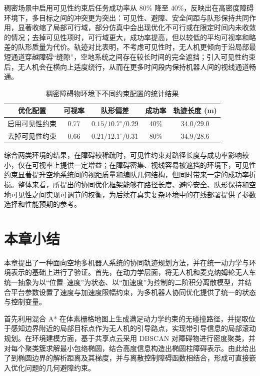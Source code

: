 稠密场景中启用可见性约束后任务成功率从 \(80\%\) 降至 \(40\%\)，反映出在高密度障碍环境下，多目标之间的冲突更为突出：可见性、避障、安全间距与队形保持共同作用，显著收缩了局部可行域，部分仿真中会出现优化不可行或在限定时间内未收敛的情况；去掉可见性项时，可行域更大，成功率提高，但以较低的平均可视率和略差的队形质量为代价。轨迹对比表明，不考虑可见性时，无人机更倾向于沿局部最短通道穿越障碍“缝隙”，空地系统之间存在较长时间的完全遮挡；引入可见性约束后，无人机会在横向上适度绕行，从而在更多时间段内保持机器人间的视线通道畅通。

\begin{table}[h]
  \caption{稠密障碍物环境下不同约束配置的统计结果}
  \label{tab:dense_stat}
  \centering
  \begin{tabular}{ccccc}
    \toprule
    优化配置 & 可视率 & 队形偏差 & 成功率 & 轨迹长度 (m)\\
    \midrule
    启用可见性约束 &
    0.77 &
    $0.15 / 10.7^\circ / 0.29$ &
    40\% &
    $34.0 / 29.0$ \\
    去掉可见性约束 &
    0.66 &
    $0.21 / 12.1^\circ / 0.31$ &
    80\% &
    $34.9 / 28.6$ \\
    \bottomrule
  \end{tabular}
\end{table}

综合两类环境的结果，在障碍较稀疏时，可见性约束对路径长度与成功率影响较小，仅在可视率上提供一定增益；在障碍密集、视线容易被遮挡的环境下，可见性约束显著提升空地系统间的视距质量和编队几何结构，但同时带来一定的成功率折损。整体来看，所提出的协同优化框架能够在路径长度、避障安全、队形保持和空地可见性之间实现可调节的权衡，为后续在真实复杂环境中的在线部署提供了参数选择和性能预期的参考。

\section{本章小结} \label{sec:summary_opt1}

本章提出了一种面向空地多机器人系统的协同轨迹规划方法，并在统一动力学与环境表示的基础上进行了验证。首先，在动力学层面，将无人机和麦克纳姆轮无人车统一抽象为以“位置–速度”为状态、以“加速度”为控制的二阶积分离散模型，并结合平台参数设置了速度与加速度限幅约束，为多机器人协同优化提供了统一的状态与控制变量。

首先利用混合 A* 在体素栅格地图上生成满足动力学约束的无碰撞路径，并提取位于感知边界附近的局部目标点作为无人机的引导路点，实现带引导信息的局部滚动规划。在环境建模方面，基于共享点云采用 DBSCAN 对障碍物进行密度聚类，并对每个聚类簇求解最小包络椭圆，结合高度信息构造出椭圆柱障碍表示。由此给出了到椭圆边界的解析距离及其梯度，并与离散控制障碍函数相结合，形成可直接嵌入优化问题的几何避障约束。


